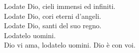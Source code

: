 
Lodate Dio, cieli immensi ed infiniti.\\
Lodate Dio, cori eterni d'angeli.\\
Lodate Dio, santi del suo regno.\\
Lodatelo uomini.\\
Dio vi ama, lodatelo uomini. Dio è con voi.